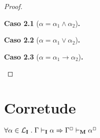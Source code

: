 \begin{proof}
\begin{case}
                \begin{case}
                    \textbf{Caso 2.1} ($\alpha = \alpha_1\wedge\alpha_2$)\textbf{.}
                \end{case}

                \begin{case}
                    \textbf{Caso 2.2} ($\alpha = \alpha_1\vee\alpha_2$)\textbf{.}
                \end{case}

                \begin{case}
                    \textbf{Caso 2.3} ($\alpha = \alpha_1\to\alpha_2$)\textbf{.}
                \end{case}
            \end{case}
        \end{proof}

    \section{Corretude}

        \begin{theorem}
            $\forall \alpha \in \mathcal{L}_\mathbf{I} \mathrel{.} \Gamma \vdash_\mathbf{I} \alpha \Rightarrow \Gamma^\Box \vdash_\mathbf{M} \alpha^\Box$
        \end{theorem}

